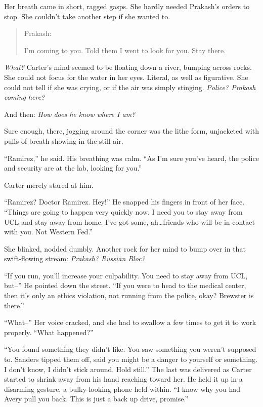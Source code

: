 Her breath came in short, ragged gasps. She hardly needed Prakash's orders to stop. She couldn't take another step if she wanted to.

\begin{quote}
Prakash:

I'm coming to you. Told them I went to look for you. Stay there.
\end{quote}

\emph{What?} Carter's mind seemed to be floating down a river, bumping across rocks. She could not focus for the water in her eyes. Literal, as well as figurative. She could not tell if she was crying, or if the air was simply stinging. \emph{Police? Prakash coming here?}

And then: \emph{How does he know where I am?}

Sure enough, there, jogging around the corner was the lithe form, unjacketed with puffs of breath showing in the still air.

``Ramirez,'' he said. His breathing was calm. ``As I'm sure you've heard, the police and security are at the lab, looking for you.''

Carter merely stared at him.

``Ramirez? Doctor Ramirez. Hey!'' He snapped his fingers in front of her face. ``Things are going to happen very quickly now. I need you to stay away from UCL and stay away from home. I've got some, ah\ldots{}friends who will be in contact with you. Not Western Fed.''

She blinked, nodded dumbly. Another rock for her mind to bump over in that swift-flowing stream: \emph{Prakash? Russian Bloc?}

``If you run, you'll increase your culpability. You need to stay away from UCL, but--'' He pointed down the street. ``If you were to head to the medical center, then it's only an ethics violation, not running from the police, okay? Brewster is there.''

``What--'' Her voice cracked, and she had to swallow a few times to get it to work properly. ``What happened?''

``You found something they didn't like. You saw something you weren't supposed to. Sanders tipped them off, said you might be a danger to yourself or something. I don't know, I didn't stick around. Hold still.'' The last was delivered as Carter started to shrink away from his hand reaching toward her. He held it up in a disarming gesture, a bulky-looking phone held within. ``I know why you had Avery pull you back. This is just a back up drive, promise.''

